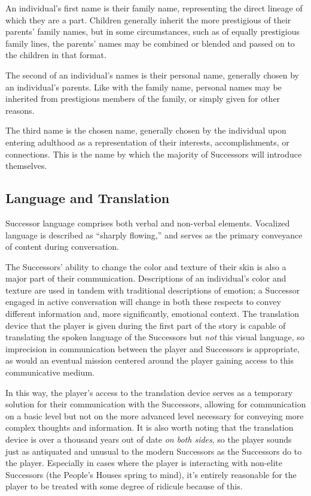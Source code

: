 \documentclass[11pt]{report}
\begin{document}
    An individual's first name is their family name, representing the direct lineage of which they are a part. Children generally inherit the more prestigious of their parents' family names, but in some circumstances, such as of equally prestigious family lines, the parents' names may be combined or blended and passed on to the children in that format.

    The second of an individual's names is their personal name, generally chosen by an individual's parents. Like with the family name, personal names may be inherited from prestigious members of the family, or simply given for other reasons.

    The third name is the chosen name, generally chosen by the individual upon entering adulthood as a representation of their interests, accomplishments, or connections. This is the name by which the majority of Successors will introduce themselves.

    \subsection{Language and Translation}

    Successor language comprises both verbal and non-verbal elements. Vocalized language is described as ``sharply flowing,'' and serves as the primary conveyance of content during conversation. 

    The Successors' ability to change the color and texture of their skin is also a major part of their communication. Descriptions of an individual's color and texture are used in tandem with traditional descriptions of emotion; a Successor engaged in active conversation will change in both these respects to convey different information and, more significantly, emotional context. The translation device that the player is given during the first part of the story is capable of translating the spoken language of the Successors but \emph{not} this visual language, so imprecision in communication between the player and Successors is appropriate, as would an eventual mission centered around the player gaining access to this communicative medium.

    In this way, the player's access to the translation device serves as a temporary solution for their communication with the Successors, allowing for communication on a basic level but not on the more advanced level necessary for conveying more complex thoughts and information. It is also worth noting that the translation device is over a thousand years out of date \emph{on both sides}, so the player sounds just as antiquated and unusual to the modern Successors as the Successors do to the player. Especially in cases where the player is interacting with non-elite Successors (the People's Houses spring to mind), it's entirely reasonable for the player to be treated with some degree of ridicule because of this.
\end{document}
